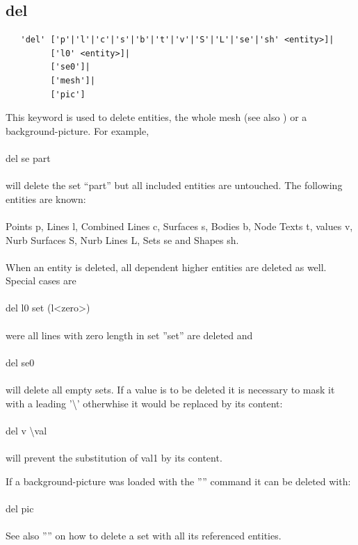 \documentclass{article}
\begin{document}
\subsection{\label{del}del}
\begin{verbatim}
   'del' ['p'|'l'|'c'|'s'|'b'|'t'|'v'|'S'|'L'|'se'|'sh' <entity>]|
         ['l0' <entity>]|
         ['se0']|
         ['mesh']|
         ['pic'] 
\end{verbatim}
This keyword is used to delete entities, the whole mesh (see also ) or a background-picture. For example,\\\\
del se part\\\\
will delete the set ``part'' but all included entities are untouched. The following entities are known:\\\\
Points p, Lines l, Combined Lines c, Surfaces s, Bodies b, Node Texts t, values v, Nurb Surfaces S, Nurb Lines L, Sets se and Shapes sh.\\\\
When an entity is deleted, all dependent higher entities are deleted as well. Special cases are\\\\del l0 set  (l<zero>)\\\\were all lines with zero length in set ''set'' are deleted and\\\\del se0\\\\will delete all empty sets.
If a value is to be deleted it is necessary to mask it with a leading '\textbackslash{}' otherwhise it would be replaced by its content:\\\\del v \textbackslash{}val\\\\will prevent the substitution of val1 by its content.

If a background-picture was loaded with the '''' command it can be deleted with:\\\\
del pic
\\\\See also '''' on how to delete a set with all its referenced entities.
\end{document}
